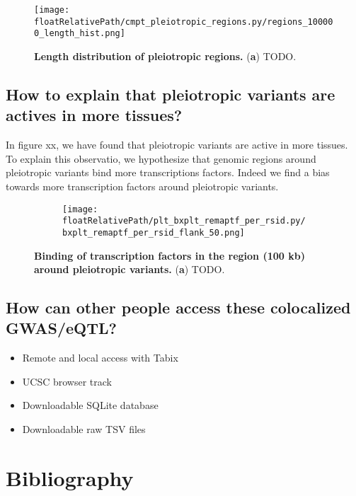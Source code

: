 \begin{figure*}[]
\centering
%
\texttt{[image: \\floatRelativePath/cmpt\_pleiotropic\_regions.py/regions\_100000\_length\_hist.png]}
%
\caption{\textbf{Length distribution of pleiotropic regions.} (\textbf{a}) TODO.} \label{fig:pleiotropy_region_distribution}
\end{figure*}

\subsection*{How to explain that pleiotropic variants are actives in more tissues?}

In figure xx, we have found that pleiotropic variants are active in more tissues.
To explain this observatio, we hypothesize that genomic regions around pleiotropic variants bind more transcriptions factors.
Indeed we find a bias towards more transcription factors around pleiotropic variants.

\begin{figure*}[!]
\centering
%
\begin{subfigure}[]{.33\textwidth}
%
\texttt{[image: \\floatRelativePath/plt\_bxplt\_remaptf\_per\_rsid.py/bxplt\_remaptf\_per\_rsid\_flank\_50.png]}
\end{subfigure}
%
\caption{\textbf{Binding of transcription factors in the region (100 kb) around pleiotropic variants.} (\textbf{a}) TODO.} \label{fig:gwas_cat_vs_egene_and_sample}
%
\end{figure*}

\subsection*{How can other people access these colocalized GWAS/eQTL?}

\begin{itemize}
  \item Remote and local access with Tabix
  \item UCSC browser track
  \item Downloadable SQLite database
  \item Downloadable raw TSV files
\end{itemize}

\section*{Bibliography}


